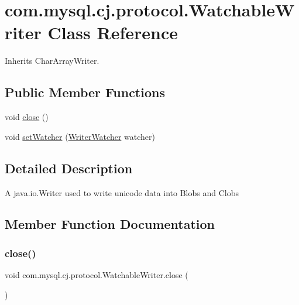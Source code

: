 \hypertarget{classcom_1_1mysql_1_1cj_1_1protocol_1_1_watchable_writer}{}\section{com.\+mysql.\+cj.\+protocol.\+Watchable\+Writer Class Reference}
\label{classcom_1_1mysql_1_1cj_1_1protocol_1_1_watchable_writer}


Inherits Char\+Array\+Writer.

\subsection*{Public Member Functions}
\begin{DoxyCompactItemize}
\item 
void \mbox{\hyperlink{classcom_1_1mysql_1_1cj_1_1protocol_1_1_watchable_writer_ad16897e4d9cda0960e3958673654aa22}{close}} ()
\item 
void \mbox{\hyperlink{classcom_1_1mysql_1_1cj_1_1protocol_1_1_watchable_writer_a272405ad2681cae2078138b821e0c324}{set\+Watcher}} (\mbox{\hyperlink{interfacecom_1_1mysql_1_1cj_1_1protocol_1_1_writer_watcher}{Writer\+Watcher}} watcher)
\end{DoxyCompactItemize}


\subsection{Detailed Description}
A java.\+io.\+Writer used to write unicode data into Blobs and Clobs 

\subsection{Member Function Documentation}
\mbox{\label{classcom_1_1mysql_1_1cj_1_1protocol_1_1_watchable_writer_ad16897e4d9cda0960e3958673654aa22}} 
\subsubsection{\texorpdfstring{close()}{close()}}
{\footnotesize\ttfamily void com.\+mysql.\+cj.\+protocol.\+Watchable\+Writer.\+close (\begin{DoxyParamCaption}{ }\end{DoxyParamCaption})}

